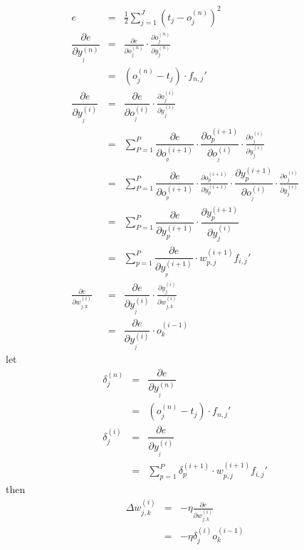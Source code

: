 \documentclass{article}
\newcommand{\cdummy}{\cdot}
\begin{document}
\begin{eqnarray*}
  e & = & \frac{1}{2} \sum^{J}_{j=1} ( t_{j} -o_{j}^{( n )} )^{2}\\
  \dfrac{\partial e}{\partial y_{_{j}}^{( n )}} & = & \frac{\partial
  e}{\partial o_{j}^{( n )}} \cdummy \frac{\partial o_{j}^{( n )}}{\partial
  y_{j}^{( n )}}\\
  & = & ( o^{( n )}_{j} -t_{j} ) \cdummy f_{n,j}'\\
  \dfrac{\partial e}{\partial y_{_{j}}^{( i )}} & = & \dfrac{\partial
  e}{\partial o_{_{j}}^{( i )}} \cdummy \frac{\partial o_{j}^{( i )}}{\partial
  y_{j}^{( i )}}\\
  & = & \sum^{P}_{P=1} \dfrac{\partial e}{\partial o_{_{p}}^{( i+1 )}}
  \cdummy \dfrac{\partial o_{p}^{( i+1 )}}{\partial o_{_{j}}^{( i )}} \cdummy
  \frac{\partial o_{j}^{( i )}}{\partial y_{j}^{( i )}}\\
  & = & \sum^{P}_{P=1} \dfrac{\partial e}{\partial o_{_{p}}^{( i+1 )}}
  \cdummy \frac{\partial o^{( i+1 )}_{p}}{\partial y^{( i+1 )}_{p}} \cdummy
  \dfrac{\partial y_{p}^{( i+1 )}}{\partial o_{_{j}}^{( i )}} \cdummy
  \frac{\partial o_{j}^{( i )}}{\partial y_{j}^{( i )}}\\
  & = & \sum^{P}_{P=1} \dfrac{\partial e}{\partial y^{( i+1 )}_{p}} \cdummy
  \dfrac{\partial y_{p}^{( i+1 )}}{\partial y_{j}^{( i )}}\\
  & = & \sum^{P}_{p=1} \dfrac{\partial e}{\partial y_{_{p}}^{( i+1 )}}
  \cdummy w^{( i+1 )}_{p,j} f_{i,j}'\\
  \frac{\partial e}{\partial w^{( i )}_{j,k}} & = & \dfrac{\partial
  e}{\partial y_{_{j}}^{( i )}} \cdummy \frac{\partial y_{j}^{( i )}}{\partial
  w_{j,k}^{( i )}}\\
  & = & \dfrac{\partial e}{\partial y_{_{j}}^{( i )}} \cdummy o_{k}^{( i-1 )}
\end{eqnarray*}
let
\begin{eqnarray*}
  \delta_{j}^{( n )} & = & \dfrac{\partial e}{\partial y_{_{j}}^{( n )}}\\
  & = & ( o^{( n )}_{j} -t_{j} ) \cdummy f_{n,j}'\\
  \delta_{j}^{( i )} & = & \dfrac{\partial e}{\partial y_{_{j}}^{( i )}}\\
  & = & \sum^{P}_{p=1} \delta^{( i+1 )}_{p} \cdummy w^{( i+1 )}_{p,j}
  f_{i,j}'
\end{eqnarray*}
then
\begin{eqnarray*}
  \Delta w_{j,k}^{( i )} & = & - \eta \frac{\partial e}{\partial w^{( i
  )}_{j,k}}\\
  & = & - \eta \delta^{( i )}_{j} o^{( i-1 )}_{k}
\end{eqnarray*}
\end{document}
